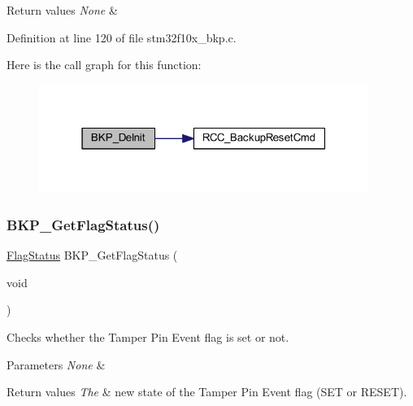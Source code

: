 \begin{DoxyRetVals}{Return values}
{\em None} & \\
\hline
\end{DoxyRetVals}


Definition at line 120 of file stm32f10x\+\_\+bkp.\+c.

Here is the call graph for this function\+:
\nopagebreak
\begin{figure}[H]
\begin{center}
\leavevmode
\includegraphics[width=304pt]{group___b_k_p___exported___functions_gaabff4d8f5ebf4fd9a840bcc9042ca226_cgraph}
\end{center}
\end{figure}
\mbox{\label{group___b_k_p___exported___functions_gacc9aedde760383f0bd146f0d77a547db}} 
\subsubsection{\texorpdfstring{B\+K\+P\+\_\+\+Get\+Flag\+Status()}{BKP\_GetFlagStatus()}}
{\footnotesize\ttfamily \hyperlink{group___exported__types_ga89136caac2e14c55151f527ac02daaff}{Flag\+Status} B\+K\+P\+\_\+\+Get\+Flag\+Status (\begin{DoxyParamCaption}\item[{void}]{ }\end{DoxyParamCaption})}



Checks whether the Tamper Pin Event flag is set or not. 


\begin{DoxyParams}{Parameters}
{\em None} & \\
\hline
\end{DoxyParams}

\begin{DoxyRetVals}{Return values}
{\em The} & new state of the Tamper Pin Event flag (S\+ET or R\+E\+S\+ET). \\
\hline
\end{DoxyRetVals}


